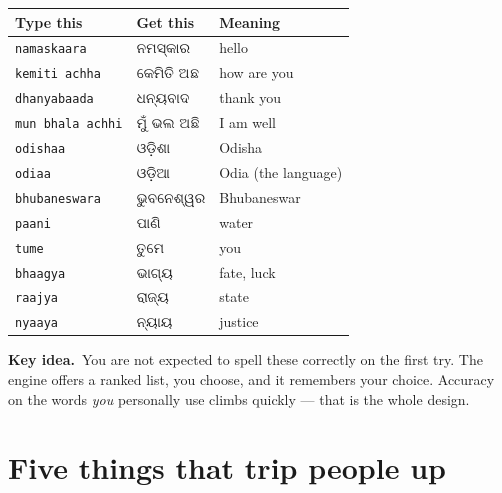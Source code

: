 \documentclass[11pt, a4paper]{article}
\newcommand{\odb}[1]{{\odiafont\large #1}}   %
\newcommand{\kidea}{{\color{midseagreen}\textbf{\textsf{Key idea.}}}\ }
\begin{document}
\begin{center}
\begin{tabular}{l l l}
\toprule
Type this & Get this & Meaning \\
\midrule
\texttt{namaskaara}   & \odb{ନମସ୍କାର}      & hello \\
\texttt{kemiti achha} & \odb{କେମିତି ଅଛ}     & how are you \\
\texttt{dhanyabaada}  & \odb{ଧନ୍ୟବାଦ}      & thank you \\
\texttt{mun bhala achhi} & \odb{ମୁଁ ଭଲ ଅଛି} & I am well \\
\texttt{odishaa}      & \odb{ଓଡ଼ିଶା}        & Odisha \\
\texttt{odiaa}        & \odb{ଓଡ଼ିଆ}         & Odia (the language) \\
\texttt{bhubaneswara} & \odb{ଭୁବନେଶ୍ୱର}    & Bhubaneswar \\
\texttt{paani}        & \odb{ପାଣି}          & water \\
\texttt{tume}         & \odb{ତୁମେ}          & you \\
\texttt{bhaagya}      & \odb{ଭାଗ୍ୟ}         & fate, luck \\
\texttt{raajya}       & \odb{ରାଜ୍ୟ}         & state \\
\texttt{nyaaya}       & \odb{ନ୍ୟାୟ}         & justice \\
\bottomrule
\end{tabular}
\end{center}

\begin{keybox}
\kidea You are not expected to spell these correctly on the first try. The engine offers
a ranked list, you choose, and it remembers your choice. Accuracy on the words
\emph{you} personally use climbs quickly --- that is the whole design.
\end{keybox}

\section{Five things that trip people up}
\end{document}

